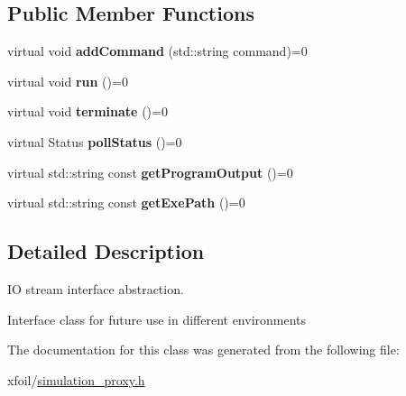 \subsection*{Public Member Functions}
\begin{DoxyCompactItemize}
\item 
\mbox{\label{class_simulation_proxy_ac1c344b77014b45b858ca19f23097232}} 
virtual void {\bfseries add\+Command} (std\+::string command)=0
\item 
\mbox{\label{class_simulation_proxy_adad562cf8271abe74d7f18cede1a9866}} 
virtual void {\bfseries run} ()=0
\item 
\mbox{\label{class_simulation_proxy_a40796f0d728183c412c045918add458b}} 
virtual void {\bfseries terminate} ()=0
\item 
\mbox{\label{class_simulation_proxy_aadbe7ca771bd5390e34600f5ddd939bd}} 
virtual Status {\bfseries poll\+Status} ()=0
\item 
\mbox{\label{class_simulation_proxy_a5155fa6c65e9484c3b8d1f6da08cc2c2}} 
virtual std\+::string const {\bfseries get\+Program\+Output} ()=0
\item 
\mbox{\label{class_simulation_proxy_ae9e11cbf59c4b41f9c495756d2d174a9}} 
virtual std\+::string const {\bfseries get\+Exe\+Path} ()=0
\end{DoxyCompactItemize}


\subsection{Detailed Description}
IO stream interface abstraction. 

Interface class for future use in different environments 

The documentation for this class was generated from the following file\+:\begin{DoxyCompactItemize}
\item 
xfoil/\hyperlink{simulation__proxy_8h}{simulation\+\_\+proxy.\+h}\end{DoxyCompactItemize}
